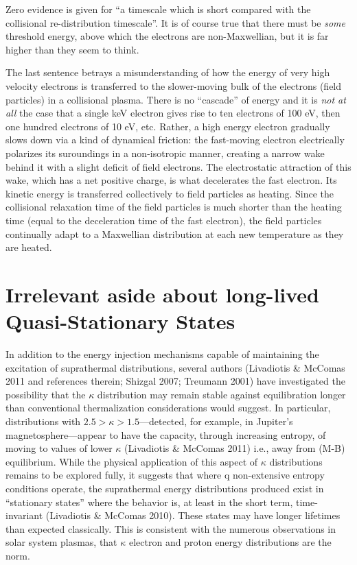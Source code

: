 \documentclass[11pt]{article}
\renewenvironment{quote}{\begin{shaded*}\small\sffamily}{\end{shaded*}}
\begin{document}
Zero evidence is given for ``a timescale which is short compared with the collisional re-distribution timescale''.  It is of course true that there must be \emph{some} threshold energy, above which the electrons are non-Maxwellian, but it is far higher than they seem to think.

The last sentence betrays a misunderstanding of how the energy of very high velocity electrons is transferred to the slower-moving bulk of the electrons (field particles) in a collisional plasma.  There is no ``cascade'' of energy and it is \emph{not at all} the case that a single keV electron gives rise to ten electrons of 100 eV, then one hundred electrons of 10 eV, etc.  Rather, a high energy electron gradually slows down via a kind of dynamical friction: the fast-moving electron electrically polarizes its suroundings in a non-isotropic manner, creating a narrow wake behind it with a slight deficit of field electrons.  The electrostatic attraction of this wake, which has a net positive charge, is what decelerates the fast electron.  Its kinetic energy is transferred collectively to field particles as heating.  Since the collisional relaxation time of the field particles is much shorter than the heating time (equal to the deceleration time of the fast electron), the field particles continually adapt to a Maxwellian distribution at each new temperature as they are heated.   


\section*{Irrelevant aside about long-lived Quasi-Stationary States}
\label{sec:orgheadline6}
\begin{quote}
In addition to the energy injection mechanisms capable of maintaining the excitation of suprathermal distributions, several authors (Livadiotis \& McComas 2011 and references therein; Shizgal 2007; Treumann 2001) have investigated the possibility that the \(\kappa\) distribution may remain stable against equilibration longer than conventional thermalization considerations would suggest. In particular, distributions with \(2.5 > \kappa > 1.5\)—detected, for example, in Jupiter’s magnetosphere—appear to have the capacity, through increasing entropy, of moving to values of lower \(\kappa\) (Livadiotis \& McComas 2011) i.e., away from (M-B) equilibrium. While the physical application of this aspect of \(\kappa\) distributions remains to be explored fully, it suggests that where q non-extensive entropy conditions operate, the suprathermal energy distributions produced exist in “stationary states” where the behavior is, at least in the short term, time-invariant (Livadiotis \& McComas 2010). These states may have longer lifetimes than expected classically. This is consistent with the numerous observations in solar system plasmas, that \(\kappa\) electron and proton energy distributions are the norm.
\end{quote}
\end{document}
